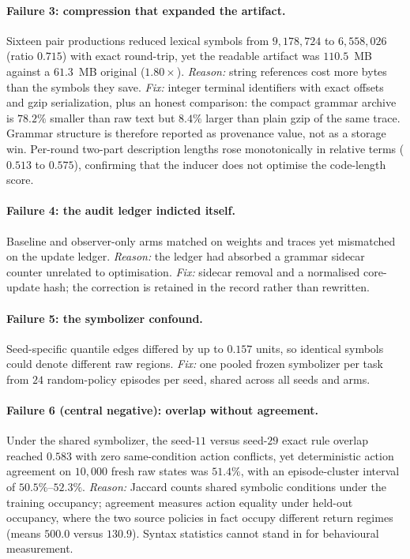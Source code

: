 \documentclass[11pt,a4paper]{article}
\theoremstyle{definition}
\begin{document}
\paragraph{Failure 3: compression that expanded the artifact.}
Sixteen pair productions reduced lexical symbols from $9{,}178{,}724$ to
$6{,}558{,}026$ (ratio $0.715$) with exact round-trip, yet the readable
artifact was $110.5$~MB against a $61.3$~MB original ($1.80\times$).
\emph{Reason:} string references cost more bytes than the symbols they save.
\emph{Fix:} integer terminal identifiers with exact offsets and gzip
serialization, plus an honest comparison: the compact grammar archive is
$78.2\%$ smaller than raw text but $8.4\%$ larger than plain gzip of the same
trace. Grammar structure is therefore reported as provenance value, not as a
storage win. Per-round two-part description lengths rose monotonically in
relative terms ($0.513$ to $0.575$), confirming that the inducer does not
optimise the code-length score.

\paragraph{Failure 4: the audit ledger indicted itself.}
Baseline and observer-only arms matched on weights and traces yet mismatched
on the update ledger. \emph{Reason:} the ledger had absorbed a grammar sidecar
counter unrelated to optimisation. \emph{Fix:} sidecar removal and a
normalised core-update hash; the correction is retained in the record rather
than rewritten.

\paragraph{Failure 5: the symbolizer confound.}
Seed-specific quantile edges differed by up to $0.157$ units, so identical
symbols could denote different raw regions. \emph{Fix:} one pooled frozen
symbolizer per task from $24$ random-policy episodes per seed, shared across
all seeds and arms.

\paragraph{Failure 6 (central negative): overlap without agreement.}
Under the shared symbolizer, the seed-$11$ versus seed-$29$ exact rule
overlap reached $0.583$ with zero same-condition action conflicts, yet
deterministic action agreement on $10{,}000$ fresh raw states was $51.4\%$,
with an episode-cluster interval of $50.5\%$--$52.3\%$.
\emph{Reason:} Jaccard counts shared symbolic conditions under the training
occupancy; agreement measures action equality under held-out occupancy, where
the two source policies in fact occupy different return regimes (means
$500.0$ versus $130.9$). Syntax statistics cannot stand in for behavioural
measurement.
\end{document}
